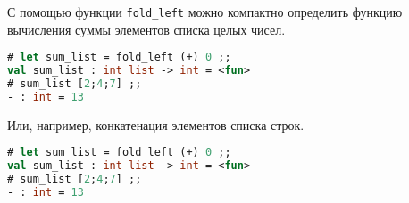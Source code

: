 С помощью функции \texttt{fold\_left} можно компактно определить функцию
вычисления суммы элементов списка целых чисел.

\begin{lstlisting}[language=OCaml]
# let sum_list = fold_left (+) 0 ;;
val sum_list : int list -> int = <fun>
# sum_list [2;4;7] ;;
- : int = 13
\end{lstlisting}

Или, например, конкатенация элементов списка строк.

\begin{lstlisting}[language=OCaml]
# let sum_list = fold_left (+) 0 ;;
val sum_list : int list -> int = <fun>
# sum_list [2;4;7] ;;
- : int = 13
\end{lstlisting}
